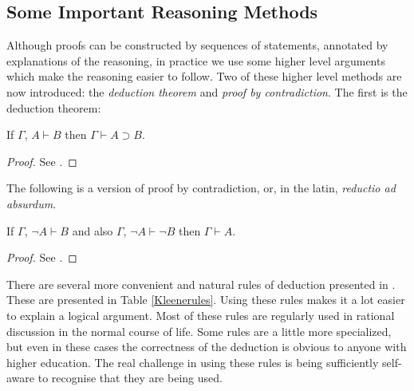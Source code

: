 \subsection{Some Important Reasoning Methods}\label{reasoningmethods}

Although proofs can be constructed by sequences of statements, annotated by explanations of the reasoning,
in practice we use some higher level arguments which make the reasoning easier to follow. Two
of these higher level methods are now introduced: the {\em deduction theorem} \cite[\S 21--22]{Kleene52}
and {\em proof by contradiction}. The first is the deduction theorem:

\begin{theorem}
If $\Gamma$, $A \vdash B$ then $\Gamma \vdash A \supset B$.
\end{theorem}

\begin{proof}
See \cite[\S 21--22]{Kleene52}.
\end{proof}

The following is a version of proof by contradiction, or, in the latin, {\em reductio ad absurdum}.
\begin{theorem}\label{reductioadabsurdum}
If $\Gamma$, $\neg A \vdash B$ and also $\Gamma$, $\neg A \vdash \neg B$ then $\Gamma \vdash A $.
\end{theorem}

\begin{proof}
See \cite[Theorem 2]{Kleene52}.
\end{proof}

There are several more convenient and natural rules of deduction presented 
in \cite[Theorem 2]{Kleene52}. These are presented in Table \ref{Kleenerules}.
Using these rules makes it a lot easier to explain a logical argument. Most of these rules
are regularly used in rational discussion in the normal course of life. Some rules are a little
more specialized, but even in these cases the correctness of the deduction is obvious
to anyone with higher education. The real challenge in using these rules is being
sufficiently self-aware to recognise that they are being used.

